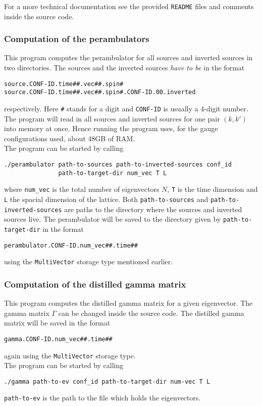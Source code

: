     For a more technical documentation see the provided \verb+README+ files and comments inside the source code.
    
    \subsubsection{Computation of the perambulators}
        This program computes the perambulator for all sources and inverted sources in two directories.
        The sources and the inverted sources \emph{have to be} in the format
        \begin{verbatim}
source.CONF-ID.time##.vec##.spin#
source.CONF-ID.time##.vec##.spin#.CONF-ID.00.inverted\end{verbatim}
        respectively. Here \verb+#+ stands for a digit and \verb+CONF-ID+ is usually a 4-digit number. The program will read in all sources and inverted sources for one pair $(k,k')$ into memory at once. Hence running the program uses, for the gauge configurations used, about 48GB of RAM.\\
        
        \noindent
        The program can be started by calling
        \begin{verbatim}
./perambulator path-to-sources path-to-inverted-sources conf_id
               path-to-target-dir num_vec T L\end{verbatim}
        where \verb+num_vec+ is the total number of eigenvectors $N$, \verb+T+ is the time dimension and \verb+L+ the spacial dimension of the lattice. Both \verb+path-to-sources+ and \verb+path-to-inverted-sources+ are paths to the directory where the sources and inverted sources live. The perambulator will be saved to the directory given by \verb+path-to-target-dir+ in the format
        \begin{verbatim}
perambulator.CONF-ID.num_vec##.time##\end{verbatim}
        using the \verb+MultiVector+ storage type mentioned earlier.
    
    \subsubsection{Computation of the distilled gamma matrix}
        This program computes the distilled gamma matrix for a given eigenvector. The gamma matrix $\Gamma$ can be changed inside the source code. The distilled gamma matrix will be saved in the format
        \begin{verbatim}
gamma.CONF-ID.num_vec##.time##\end{verbatim}
        again using the \verb+MultiVector+ storage type.\\
        The program can be started by calling
        \begin{verbatim}
./gamma path-to-ev conf_id path-to-target-dir num-vec T L\end{verbatim}
        \verb+path-to-ev+ is the path to the file which holds the eigenvectors.
        
